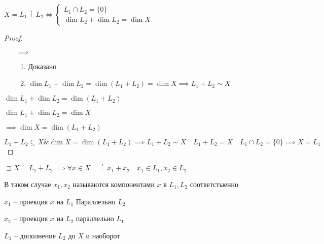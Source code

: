 \documentclass{book}
\newcommand{\ov}[2]{\overset{#1}{#2}}
\theoremstyle{definition}
\begin{document}
 \begin{theorem}
     $X = L_1 \dotplus L_2 \iff \begin{cases}
         L_1\cap L_2 = \{0\}\\
         \dim L_2 + \dim L_2 = \dim X
     \end{cases}$
 \end{theorem}
 \begin{proof}
     \begin{itemize}
         \item []
         \item [$\implies $]
             \begin{enumerate}
                 \item Доказано
                 \item $\dim L_1 + \dim L_2 = \dim (L_1+L_2) = \dim X \implies L_1+L_2\sim X$
             \end{enumerate}
     \end{itemize}
 \item $\dim L_1+\dim L_2 = \dim (L_1+L_2)$

     $\dim L_1 + \dim L_2 = \dim X$

     $\implies \dim X = \dim (L_1+L_2)$

     $L_1+L_2\subseteq X \& \dim X = \dim (L_1+L_2) \implies L_1+L_2\sim X\quad L_1+L_2 = X\quad L_1\cap L_2 = \{0\} \implies  X = L_1$
 \end{proof}
\begin{definition}
    $\sqsupset X = L_1 \dotplus L_2 \implies \forall x\in X\quad \ov{!}= x_1+x_2\quad x_1\in L_1, x_2\in L_2$

    В таком случае $x_1, x_2$ называются компонентами $x$ в  $L_1, L_2$ соответстыенно

    $x_1$ -- проекция $x$ на  $L_1$ Параллельно $L_2$

    $x_2$ -- проекция $x$ на  $L_2$ параллельно $L_1$

    $L_1$ -- дополнение $L_2$ до $X$ и наоборот
\end{definition}
\end{document}
